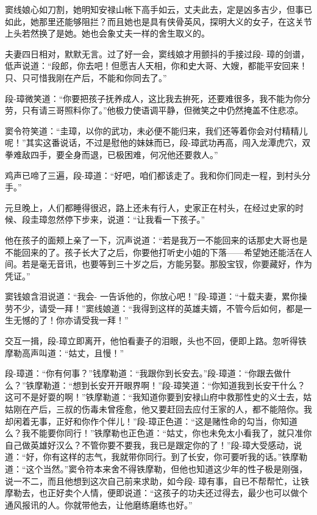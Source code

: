 \documentclass[12pt,oneside]{book}
\begin{document}
窦线娘心如刀割，她明知安禄山帐下高手如云，丈夫此去，定是凶多吉少，但事已如此，她那里还能够阻拦？而且她也是具有侠骨英风，探明大义的女子，在这关节上头若然换了是她。她也会象丈夫一样的舍生取义的。

夫妻四日相对，默默无言。过了好一会，窦线娘才用颤抖的手接过段-
璋的剑谱，低声说道：``段郎，你去吧！但愿吉人天相，你和史大哥、大嫂，都能平安回来！只、只可惜我刚在产后，不能和你同去了。''

段-璋微笑道：``你要把孩子抚养成人，这比我去拚死，还要难很多，我不能为你分劳，只有请三哥照料你了。''他极力使语调平静，但微笑之中仍然掩盖不住悲凉。

窦令符笑道：``圭璋，以你的武功，未必便不能归来，我们还等着你会对付精精儿呢！''其实这番说话，不过是慰他的妹妹而已，段-璋武功再高，闯入龙潭虎穴，双拳难敌四手，要全身而退，已极困难，何况他还要救人。''

鸡声已啼了三遍，段-璋道：``好吧，咱们都该走了。我和你们同走一程，到村头分手。''

元旦晚上，人们都睡得很迟，路上还未有行人，史家正在村头，在经过史家的时候、段圭璋忽然停下步来，说道：``让我看一下孩子。''

他在孩子的面颊上亲了一下，沉声说道：``若是我万一不能回来的话那史大哥也是不能回来的了。孩子长大了之后，你要他打听史小姐的下落------希望她还能活在人间。若是毫无音讯，也要等到三十岁之后，方能另娶。那股宝钗，你要藏好，作为凭证。''

窦钱娘含泪说道：``我会-
一告诉他的，你放心吧！''段-璋道：``十载夫妻，累你操劳不少，请受一拜！''窦线娘道：``我得到这样的英雄夫婿，不管今后如何，都是一生无憾的了！你亦请受我一拜！''

交互一揖，段-璋立即离开，他怕看妻子的泪眼，头也不回，便即上路。忽听得铁摩勒高声叫道：``姑丈，且慢！''

段-璋道：``你有何事？''钱摩勒道：``我跟你到长安去。''段-璋道：``你跟去做什么？''铁摩勒道：``想到长安开开眼界啊！''段-璋笑道：``你知道我到长安干什么？这可不是好耍的啊！''铁摩勒道：``我知道你要到安禄山府中救那性史的义士去，姑姑刚在产后，三叔的伤毒未曾痊愈，他又要赶回去应付王家的人，都不能陪你。我却闲着无事，正好和你作个伴儿！''段-璋正色道：``这是赌性命的勾当，你知道么？我不能要你同行！''铁摩勒也正色道：``姑丈，你也未免太小看我了，就只准你自己做英雄好汉么？不管你要不要我，我已是跟定你的了！''段-璋大受感动，说道：``好，你有这样的志气，我就带你同行。到了长安，你可要听我的话。''铁摩勒道：``这个当然。''窦令符本来舍不得铁摩勒，但他也知道这少年的性子极是刚强，说一不二，而且他想到这次自己前来求助，如今段-
璋有事，自已不帮帮忙，让铁摩勒去，也正好卖个人情，便即说道：``这孩子的功夫还过得去，最少也可以做个通风报讯的人。你就带他去，让他磨练磨练也好。''
\end{document}
